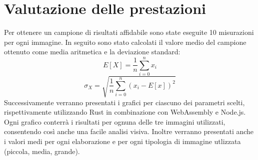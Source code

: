 \section{Valutazione delle prestazioni}
Per ottenere un campione di risultati affidabile sono state eseguite 10 misurazioni per ogni immagine.
In seguito sono stato calcolati il valore medio del campione ottenuto come media aritmetica e la deviazione standard:
\begin{equation*}
    E[X]=\frac{1}{n}\sum_{i=0}^{n}x_i
\end{equation*}
\begin{equation*}
    \sigma_X = \sqrt{\frac{1}{n}\sum_{i=0}^{n}(x_i-E[x])^2}
\end{equation*}
Successivamente verranno presentati i grafici per ciascuno dei parametri scelti, rispettivamente utilizzando Rust in combinazione con WebAssembly e Node.js. Ogni grafico conterrà i risultati per ognuna delle tre immagini utilizzati, consentendo così anche una facile analisi visiva.
Inoltre verranno presentati anche i valori medi per ogni elaborazione e per ogni tipologia di immagine utlizzata (piccola, media, grande).
